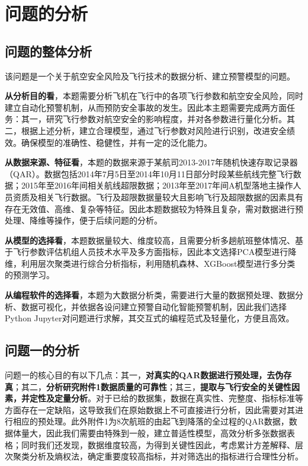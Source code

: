 \documentclass{MathorCupModeling}
\begin{document}
	\section{问题的分析}
	\subsection{问题的整体分析}
	该问题是一个关于航空安全风险及飞行技术的数据分析、建立预警模型的问题。
	
	\textbf{从分析目的看}，本题需要分析飞机在飞行中的各项飞行参数和航空安全风险，同时建立自动化预警机制，从而预防安全事故的发生。因此本主题需要完成两方面任务：其一，研究飞行参数对航空安全的影响程度，并对各参数进行量化分析。其二，根据上述分析，建立合理模型，通过飞行参数对风险进行识别，改进安全绩效。确保模型的准确性、稳健性，并有一定的泛化能力。

	\textbf{从数据来源、特征看}，本题的数据来源于某航司2013-2017年随机快速存取记录器（QAR）。数据包括2014年7月5日至2014年10月11日部分时段某些航线完整飞行数据；2015年至2016年间相关航线超限数据；2013年至2017年间A机型落地主操作人员资质及相关飞行数据。飞行及超限数据量较大且影响飞行及超限数据的因素具有存在无效值、高维、复杂等特征。因此本题数据较为特殊且复杂，需对数据进行预处理、降维等操作，便于后续问题的分析。
	
	\textbf{从模型的选择看}，本题数据量较大、维度较高，且需要分析多趟航班整体情况、基于飞行参数评估机组人员技术水平及多方面指标，因此本文选择PCA模型进行降维，利用层次聚类进行综合分析指标，利用随机森林、XGBoost模型进行多分类的预测学习。

	\textbf{从编程软件的选择看}，本题为大数据分析类，需要进行大量的数据预处理、数据分析、数据可视化，并依据各设问建立预警自动化智能预警机制，因此我们选择Python Jupyter对问题进行求解，其交互式的编程范式及轻量化，方便且高效。
	
	\subsection{问题一的分析}
	问题一的核心目的有以下几点：{\heiti 其一}，\textbf{对真实的QAR数据进行预处理，去伪存真}；{\heiti 其二}，\textbf{分析研究附件1数据质量的可靠性}；{\heiti 其三}，\textbf{提取与飞行安全的关键性因素，并定性及定量分析}。对于已给的数据集，数据在真实性、完整度、指标标准等方面存在一定缺陷，这导致我们在原始数据上不可直接进行分析，因此需要对其进行相应的预处理。此外附件1为8次航班的由起飞到降落的全过程的QAR数据，数据体量大，因此我们需要由特殊到一般，建立普适性模型，高效分析多张数据表格；同时我们还发现，数据维度较高，为得到关键性因此，考虑累计方差解释、层次聚类分析及熵权法，确定重要度较高指标，并对筛选出的指标进行合理性分析。
\end{document}
